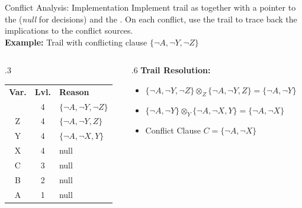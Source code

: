 \documentclass[t]{sdqbeamer}
\begin{document}
\begin{frame}{Conflict Analysis: Implementation}
Implement trail as  together with a pointer to the  (\emph{null} for decisions) and the . On each conflict, use the trail to trace back the implications to the conflict sources.\\[1em]
\textbf{Example:} Trail with conflicting clause $\{\lnot A, \lnot Y, \lnot Z \}$\\[1ex]
\begin{columns}[T]
\begin{column}{.3\linewidth}
	\begin{tabular}{ccl}
	\textbf{Var.} & \textbf{Lvl.} & \textbf{Reason} \\
	\blitz & 4 & $\{\lnot A, \lnot Y, \lnot Z \}$ \\
	Z & 4 & $\{\lnot A, \lnot Y, Z \}$ \\
	Y & 4 & $\{\lnot A, \lnot X, Y \}$ \\
	X & 4 & null\\
	C & 3 & null\\
	B & 2 & null\\
	A & 1 & null\\
	\end{tabular}
\end{column}
\begin{column}{.6\linewidth}
	\textbf{Trail Resolution:}
	\setlength{\leftmargini}{1em}
	\begin{itemize}\setlength{\itemsep}{1ex}
	\item $\{\lnot A, \lnot Y, \lnot Z\}\!\otimes_Z\!\{\lnot A, \lnot Y, Z\}\!=\!\{\lnot A, \lnot Y\}$
	\item $\{\lnot A, \lnot Y\}\!\otimes_Y\!\{\lnot A, \lnot X, Y \}\!=\!\{\lnot A, \lnot X\}$
	\item Conflict Clause $C = \{\lnot A, \lnot X\}$
	\end{itemize} 
\end{column}
\end{columns}
\end{frame}
\end{document}
